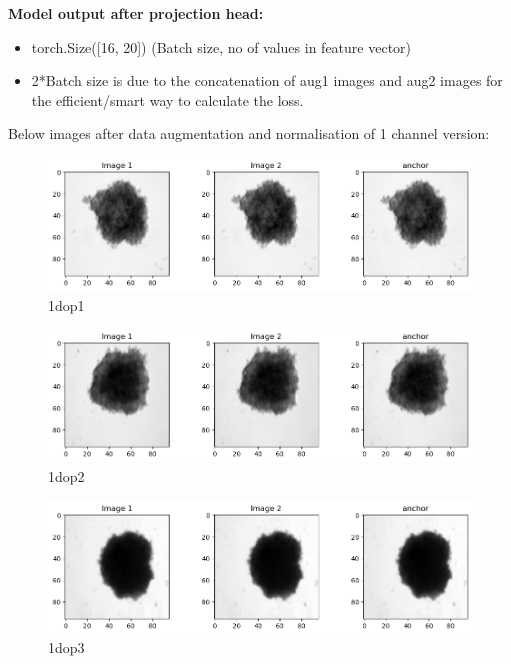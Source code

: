 \documentclass[a4paper,12pt]{report}
\begin{document}
\textbf{Model output after projection head:}
\begin{itemize}
  \item torch.Size([16, 20])  (Batch size, no of values in feature vector)  

  \item 2*Batch size is due to the concatenation of aug1 images and aug2 images for the efficient/smart way to calculate the loss. 
\end{itemize}
Below images after data augmentation and normalisation of 1 channel version:
\begin{figure}[H]
  \centering
  \includegraphics[width=0.9\linewidth]{figures/1dop1.png} %
  \caption{1dop1}
  \label{fig:1doutput1}
\end{figure}

\begin{figure}[H]
  \centering
  \includegraphics[width=0.9\linewidth]{figures/1dop2.png} %
  \caption{1dop2}
  \label{fig:1doutput2}
\end{figure}

\begin{figure}[H]
  \centering
  \includegraphics[width=0.9\linewidth]{figures/1dop3.png} %
  \caption{1dop3}
  \label{fig:1doutput3}
\end{figure}
\end{document}
